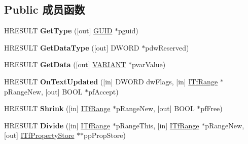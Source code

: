 \subsection*{Public 成员函数}
\begin{DoxyCompactItemize}
\item 
\mbox{\label{interface_i_tf_property_store_a6a710284931c0b65586c4271cc390e97}} 
H\+R\+E\+S\+U\+LT {\bfseries Get\+Type} (\mbox{[}out\mbox{]} \hyperlink{interface_g_u_i_d}{G\+U\+ID} $\ast$pguid)
\item 
\mbox{\label{interface_i_tf_property_store_a9ca4d36e4881e2593ab8a6c6e4da57d2}} 
H\+R\+E\+S\+U\+LT {\bfseries Get\+Data\+Type} (\mbox{[}out\mbox{]} D\+W\+O\+RD $\ast$pdw\+Reserved)
\item 
\mbox{\label{interface_i_tf_property_store_aaa9bf4439b9799b311a814fa4647aa75}} 
H\+R\+E\+S\+U\+LT {\bfseries Get\+Data} (\mbox{[}out\mbox{]} \hyperlink{structtag_v_a_r_i_a_n_t}{V\+A\+R\+I\+A\+NT} $\ast$pvar\+Value)
\item 
\mbox{\label{interface_i_tf_property_store_a363c5d2a031e38c5398d32920a18db66}} 
H\+R\+E\+S\+U\+LT {\bfseries On\+Text\+Updated} (\mbox{[}in\mbox{]} D\+W\+O\+RD dw\+Flags, \mbox{[}in\mbox{]} \hyperlink{interface_i_tf_range}{I\+Tf\+Range} $\ast$p\+Range\+New, \mbox{[}out\mbox{]} B\+O\+OL $\ast$pf\+Accept)
\item 
\mbox{\label{interface_i_tf_property_store_a7f91455c208d238c3ccfe21df570de83}} 
H\+R\+E\+S\+U\+LT {\bfseries Shrink} (\mbox{[}in\mbox{]} \hyperlink{interface_i_tf_range}{I\+Tf\+Range} $\ast$p\+Range\+New, \mbox{[}out\mbox{]} B\+O\+OL $\ast$pf\+Free)
\item 
\mbox{\label{interface_i_tf_property_store_a1cb3f883743b3b19b314d10c25bdfd0b}} 
H\+R\+E\+S\+U\+LT {\bfseries Divide} (\mbox{[}in\mbox{]} \hyperlink{interface_i_tf_range}{I\+Tf\+Range} $\ast$p\+Range\+This, \mbox{[}in\mbox{]} \hyperlink{interface_i_tf_range}{I\+Tf\+Range} $\ast$p\+Range\+New, \mbox{[}out\mbox{]} \hyperlink{interface_i_tf_property_store}{I\+Tf\+Property\+Store} $\ast$$\ast$pp\+Prop\+Store)
\item 
$$
\end{DoxyCompactItemize}
